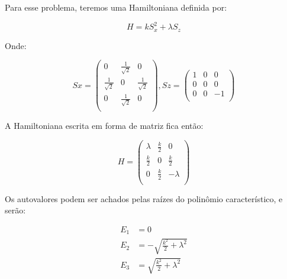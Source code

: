 Para esse problema, teremos uma Hamiltoniana definida por:

\begin{equation}
H=kS_{x}^{2} + \lambda S_z
\end{equation}

Onde:

\begin{equation}
Sx=\left(
\begin{array}{ccc}
 0 & \frac{1}{\sqrt{2}} & 0 \\
 \frac{1}{\sqrt{2}} & 0 & \frac{1}{\sqrt{2}} \\
 0 & \frac{1}{\sqrt{2}} & 0 \\
\end{array}
\right),
Sz= \left(
\begin{array}{ccc}
 1 & 0 & 0 \\
 0 & 0 & 0 \\
 0 & 0 & -1 \\
\end{array}
\right)
\end{equation}

A Hamiltoniana escrita em forma de matriz fica então:

\begin{equation}
H= \left(
\begin{array}{ccc}
 \lambda & \frac{k}{2} & 0 \\
 \frac{k}{2} & 0 & \frac{k}{2} \\
 0 & \frac{k}{2} & -\lambda \\
\end{array}
\right)
\end{equation}

Os autovalores podem ser achados pelas raízes do polinômio característico, e serão:

\begin{equation}
\begin{split}
E_1&=0 \\
E_2&=-\sqrt{\frac{k^2}{2}+\lambda^2} \\
E_3&=\sqrt{\frac{k^2}{2}+\lambda^2}
\end{split}
\end{equation}

